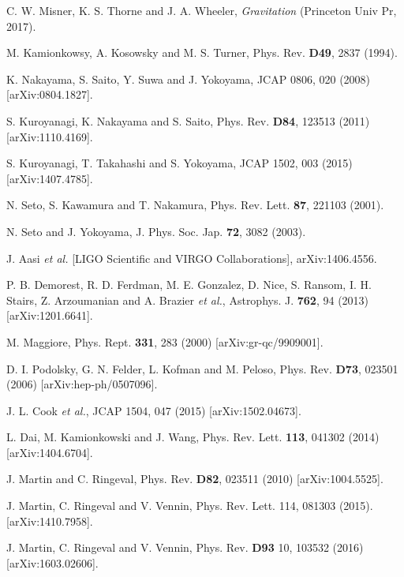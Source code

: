 \documentclass[11pt,a4paper,twoside]{book}
\begin{document}
\begin{thebibliography}{2}
	 C. W. Misner, K. S. Thorne and J. A. Wheeler, \textit{Gravitation} (Princeton Univ Pr, 2017).
	
	 M. Kamionkowsy, A. Kosowsky and M. S. Turner, Phys. Rev. \textbf{D49}, 2837 (1994).
	
	 K. Nakayama, S. Saito, Y. Suwa and J. Yokoyama, JCAP 0806, 020 (2008) [arXiv:0804.1827].
	
	 S. Kuroyanagi, K. Nakayama and S. Saito, Phys. Rev. \textbf{D84}, 123513 (2011) [arXiv:1110.4169].
	
	 S. Kuroyanagi, T. Takahashi and S. Yokoyama, JCAP 1502, 003 (2015) [arXiv:1407.4785]. 
	
	 N. Seto, S. Kawamura and T. Nakamura, Phys. Rev. Lett. \textbf{87}, 221103 (2001).
	
	 N. Seto and J. Yokoyama, J. Phys. Soc. Jap. \textbf{72}, 3082 (2003).
	
	 J. Aasi \textit{et al.} [LIGO Scientific and VIRGO Collaborations], arXiv:1406.4556.
	
	 P. B. Demorest, R. D. Ferdman, M. E. Gonzalez, D. Nice, S. Ransom, I. H. Stairs, Z. Arzoumanian and A. Brazier \textit{et al.}, Astrophys. J. \textbf{762}, 94 (2013) [arXiv:1201.6641].
		
	 M. Maggiore, Phys. Rept. \textbf{331}, 283 (2000) [arXiv:gr-qc/9909001].	
	
	 D. I. Podolsky, G. N. Felder, L. Kofman and M. Peloso, Phys. Rev. \textbf{D73}, 023501 (2006) [arXiv:hep-ph/0507096].
	
	 J. L. Cook \textit{et al.}, JCAP 1504, 047 (2015) [arXiv:1502.04673].
	
	 L. Dai, M. Kamionkowski and J. Wang, Phys. Rev. Lett. \textbf{113}, 041302 (2014) [arXiv:1404.6704].
	
	 J. Martin and C. Ringeval, Phys. Rev. \textbf{D82}, 023511 (2010) [arXiv:1004.5525].
	
	 J. Martin, C. Ringeval and V. Vennin, Phys. Rev. Lett. 114, 081303 (2015). [arXiv:1410.7958].
	
	 J. Martin, C. Ringeval and V. Vennin, Phys. Rev. \textbf{D93} 10, 103532 (2016) [arXiv:1603.02606].
	

\end{thebibliography}
\end{document}
